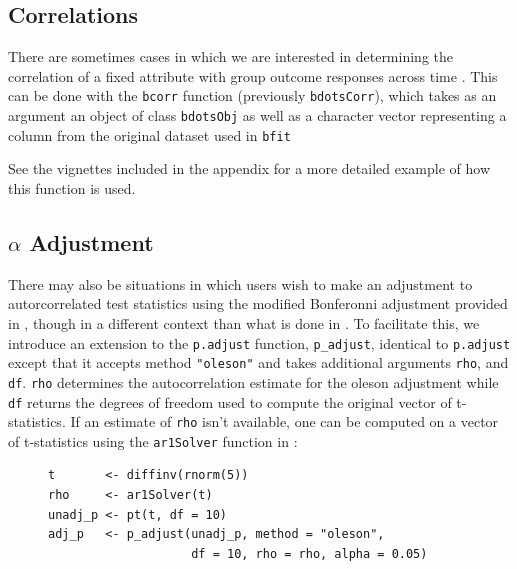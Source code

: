 \subsection{Correlations}

There are sometimes cases in which we are interested in determining the correlation of a fixed attribute with group outcome responses across time . This can be done with the \texttt{bcorr} function (previously \texttt{bdotsCorr}), which takes as an argument an object of class \texttt{bdotsObj} as well as a character vector representing a column from the original dataset used in \texttt{bfit}

\begin{center}
\end{center}

See the vignettes included in the appendix for a more detailed example of how this function is used.

\subsection{$\alpha$ Adjustment}

There may also be situations in which users wish to make an adjustment to autorcorrelated test statistics using the modified Bonferonni adjustment provided in \cite{oleson2017detecting}, though in a different context than what is done in . To facilitate this, we introduce an extension to the \texttt{p.adjust} function, \texttt{p\_adjust}, identical to \texttt{p.adjust} except that it accepts method \texttt{"oleson"} and takes additional arguments \texttt{rho}, and \texttt{df}. \texttt{rho} determines the autocorrelation estimate for the oleson adjustment while \texttt{df} returns the degrees of freedom used to compute the original vector of t-statistics. If an estimate of \texttt{rho} isn't available, one can be computed on a vector of t-statistics using the \texttt{ar1Solver} function in :


\begin{singlespace}
\begin{figure}[H]
\centering
\begin{BVerbatim}
t       <- diffinv(rnorm(5))
rho     <- ar1Solver(t)
unadj_p <- pt(t, df = 10)
adj_p   <- p_adjust(unadj_p, method = "oleson", 
                    df = 10, rho = rho, alpha = 0.05)
\end{BVerbatim}
\end{figure}
\end{singlespace}

